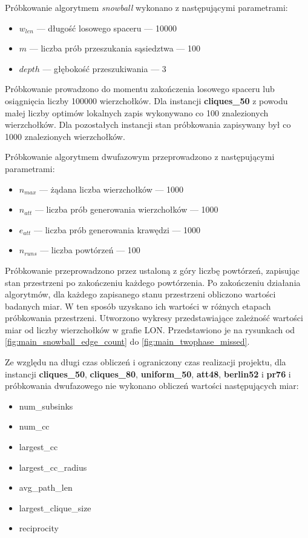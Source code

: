 Próbkowanie algorytmem \textit{snowball} wykonano z następującymi parametrami:
\begin{itemize}
    \item $w_{len}$ --- długość losowego spaceru --- 10000
    \item $m$ --- liczba prób przeszukania sąsiedztwa --- 100
    \item $depth$ --- głębokość przeszukiwania --- 3
\end{itemize}

Próbkowanie prowadzono do momentu zakończenia losowego spaceru lub osiągnięcia liczby 100000 wierzchołków.
Dla instancji \textbf{cliques\_50} z powodu małej liczby optimów lokalnych zapis wykonywano co 100 znalezionych wierzchołków.
Dla pozostałych instancji stan próbkowania zapisywany był co 1000 znalezionych wierzchołków.

Próbkowanie algorytmem dwufazowym przeprowadzono z następującymi parametrami:
\begin{itemize}
    \item $n_{max}$ --- żądana liczba wierzchołków --- 1000
    \item $n_{att}$ --- liczba prób generowania wierzchołków --- 1000
    \item $e_{att}$ --- liczba prób generowania krawędzi --- 1000
    \item $n_{runs}$ --- liczba powtórzeń --- 100
\end{itemize}

Próbkowanie przeprowadzono przez ustaloną z góry liczbę powtórzeń, zapisując stan przestrzeni po zakończeniu każdego powtórzenia.
Po zakończeniu działania algorytmów, dla każdego zapisanego stanu przestrzeni obliczono wartości badanych miar. W ten sposób uzyskano
ich wartości w różnych etapach próbkowania przestrzeni.
Utworzono wykresy przedstawiające zależność wartości miar od liczby wierzchołków w grafie LON.
Przedstawiono je na rysunkach od \ref{fig:main_snowball_edge_count} do \ref{fig:main_twophase_missed}.

Ze względu na długi czas obliczeń i ograniczony czas realizacji projektu,
dla instancji \textbf{cliques\_50}, \textbf{cliques\_80}, \textbf{uniform\_50}, \textbf{att48}, \textbf{berlin52} i \textbf{pr76} i próbkowania dwufazowego
nie wykonano obliczeń wartości następujących miar:

\begin{itemize}
    \item num\_subsinks
    \item num\_cc
    \item largest\_cc
    \item largest\_cc\_radius
    \item avg\_path\_len
    \item largest\_clique\_size
    \item reciprocity
\end{itemize}

